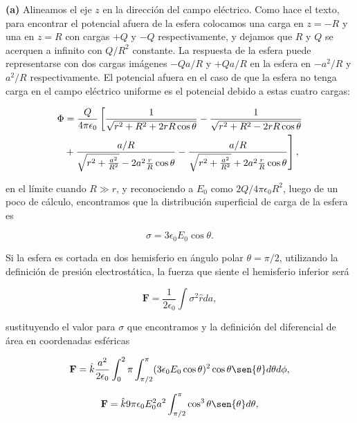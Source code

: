 \documentclass[a4paper,11pt]{article}
\numberwithin{equation}{section}
\newcommand{\zerodel}{.\kern-\nulldelimiterspace}
\begin{document}
\vspace{.3cm}

\textbf{(a)} Alineamos el eje $z$ en la dirección del campo eléctrico. Como hace 
el texto, para encontrar el potencial afuera de la esfera colocamos una carga en 
$z = -R$ y una en $z = R$ con cargas $+Q$ y $-Q$ respectivamente, y dejamos que 
$R$ y $Q$ se acerquen a infinito con $Q/R^2$ constante. La respuesta de la esfera 
puede representarse con dos cargas imágenes $-Qa/R$ y $+Qa/R$ en la esfera en 
$-a^2/R$ y $a^2/R$ respectivamente. El potencial afuera en el caso de que la 
esfera no tenga carga en el campo eléctrico uniforme es el potencial debido a 
estas cuatro cargas:

\begin{align*}
 \Phi &= \frac{Q}{4\pi\epsilon_0}\left[ \frac{1}{\sqrt{r^2 + R^2 + 2rR\cos{\theta}}} 
 - \frac{1}{\sqrt{r^2 + R^2 - 2rR\cos{\theta}}}\right\zerodel \\
 &+\left\zerodel \frac{a/R}{\sqrt{r^2+\frac{a^2}{R^2}}-2a^2\frac{r}{R}\cos{\theta}}
 - \frac{a/R}{\sqrt{r^2+\frac{a^2}{R^2}}+2a^2\frac{r}{R}\cos{\theta}}\right],
\end{align*}

en el límite cuando $R\gg r$, y reconociendo a $E_0$ como $2Q/4\pi\epsilon_0 R^2$, 
luego de un poco de cálculo, encontramos que la distribución superficial de carga 
de la esfera es 

\begin{equation}
 \sigma = 3\epsilon_0 E_0 \cos{\theta}.
\end{equation}

Si la esfera es cortada en dos hemisferio en ángulo polar $\theta = \pi/2$, utilizando 
la definición de presión electrostática, la fuerza que siente el hemisferio inferior 
será 

\begin{equation}
 \mathbf{F} = \frac{1}{2\epsilon_0}\int \sigma^2 \hat{r} da,
\end{equation}

sustituyendo el valor para $\sigma$ que encontramos y la definición del diferencial 
de área en coordenadas esféricas

\begin{equation}
 \mathbf{F} = \hat{k} \frac{a^2}{2\epsilon_0}\int_0^2\pi \int_{\pi/2}^\pi 
 (3\epsilon_0 E_0 \cos{\theta})^2\cos{\theta}\sen{\theta}d\theta d\phi,
\end{equation}

\begin{equation}
 \mathbf{F} = \hat{k} 9\pi \epsilon_0 E_0^2 a^2 \int_{\pi/2}^\pi \cos^3{\theta}
 \sen{\theta} d\theta,
\end{equation}
\end{document}
